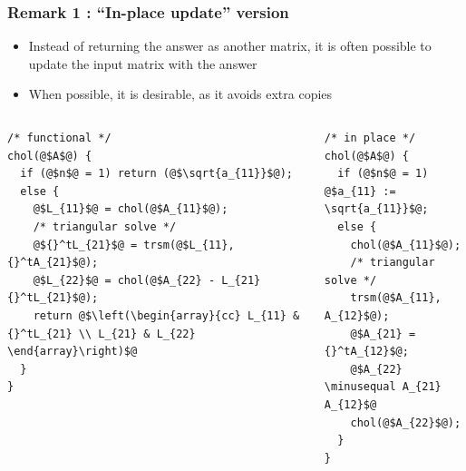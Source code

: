 \documentclass[12pt,dvipdfmx]{beamer}
\newcommand{\minusequal}{\mbox{\tt\ -= }}
\begin{document}
\begin{frame}[fragile]
\frametitle{Remark 1 : ``In-place update'' version}
\begin{itemize}
\item Instead of returning the answer as another matrix,
it is often possible to update the input matrix with the answer
\item When possible, it is desirable, as it avoids extra copies
\end{itemize}

\begin{columns}[t]
\begin{column}{0.5\textwidth}
\begin{lstlisting}[basicstyle=\scriptsize]
/* functional */
chol(@$A$@) {
  if (@$n$@ = 1) return (@$\sqrt{a_{11}}$@);
  else {
    @$L_{11}$@ = chol(@$A_{11}$@);
    /* triangular solve */
    @${}^tL_{21}$@ = trsm(@$L_{11}, {}^tA_{21}$@);
    @$L_{22}$@ = chol(@$A_{22} - L_{21}{}^tL_{21}$@);
    return @$\left(\begin{array}{cc} L_{11} & {}^tL_{21} \\ L_{21} & L_{22} \end{array}\right)$@
  }
}
\end{lstlisting}
\end{column}

\begin{column}{0.5\textwidth}
\begin{lstlisting}[basicstyle=\scriptsize]
/* in place */
chol(@$A$@) {
  if (@$n$@ = 1) @$a_{11} := \sqrt{a_{11}}$@;
  else {
    chol(@$A_{11}$@);
    /* triangular solve */
    trsm(@$A_{11}, A_{12}$@);
    @$A_{21} = {}^tA_{12}$@;
    @$A_{22} \minusequal A_{21} A_{12}$@
    chol(@$A_{22}$@);
  }
}
\end{lstlisting}
\end{column}
\end{columns}
\end{frame}
\end{document}

